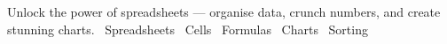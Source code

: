   {Unlock the power of spreadsheets --- organise data, crunch numbers, and create stunning charts.}
  {\faFileExcel\ Spreadsheets \quad \faTable\ Cells \quad \faCalculator\ Formulas \quad \faChartBar\ Charts \quad \faSort\ Sorting}
